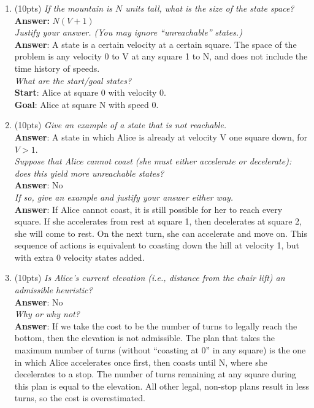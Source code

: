 \documentclass[fleqn]{hermans-hw}
\begin{document}

\begin{enumerate}
\item(10pts) \textit{If the mountain is $N$ units tall, what is the size of the state space? } \\
\textbf{Answer: } $ N(V+1) $\\
\textit{Justify your answer.  (You may ignore ``unreachable'' states.) } \\
\textbf{Answer}: A state is a certain velocity at a certain square. The space of the problem is any velocity 0 to V at any square 1 to N, and does not include the time history of speeds. \\
\textit{What are the start/goal states?}\\
\textbf{Start}: Alice at square 0 with velocity 0.\\
\textbf{Goal}: Alice at square N with speed 0.

\item(10pts) \textit{Give an example of a state that is not reachable.}  \\
\textbf{Answer}: A state in which Alice is already at velocity V one square down, for $ V > 1 $.\\
\textit{Suppose that Alice cannot coast (she must either accelerate or decelerate): does this
yield \emph{more} unreachable states?}\\
\textbf{Answer}: No\\
\textit{If so, give an example and justify your answer either way.}\\
\textbf{Answer}: If Alice cannot coast, it is still possible for her to reach every square. If she accelerates from rest at square 1, then decelerates at square 2, she will come to rest. On the next turn, she can accelerate and move on. This sequence of actions is equivalent to coasting down the hill at velocity 1, but with extra 0 velocity states added.
\item(10pts) \textit{Is Alice's current elevation (i.e., distance from the chair lift)
an admissible heuristic?}  \\
\textbf{Answer}: No\\
\textit{Why or why not?}\\
\textbf{Answer}: If we take the cost to be the number of turns to legally reach the bottom, then the elevation is not admissible. The plan that takes the maximum number of turns (without ``coasting at 0'' in any square) is the one in which Alice accelerates once first, then coasts until N, where she decelerates to a stop.  The number of turns remaining at any square during this plan is equal to the elevation.  All other legal, non-stop plans result in less turns, so the cost is overestimated.


\end{enumerate}
\end{document}
